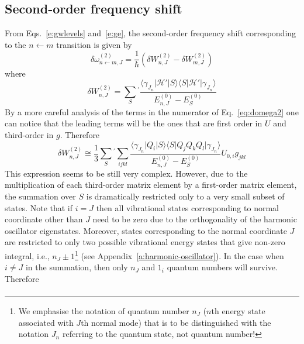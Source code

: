 \documentclass[a4paper,titlepage,twoside,fleqn,12pt]{book}
\begin{document}
\begin{refsection}
\subsection{Second-order frequency shift}

From Eqs.~\eqref{e:gwlevels} and~\eqref{e:ge}, the second\hyp{}order 
frequency shift corresponding to the $n\leftarrow m$ transition 
is given by
%
\begin{equation}\label{e:dw-second-order-pt}
\delta \omega_{n\leftarrow m,J}^{(2)} = 
\frac{1}{\hbar} 
\left( \delta W_{n,J}^{(2)} - \delta W_{m,J}^{(2)} \right)
\end{equation}
%
where
%
\begin{equation}\label{eq:domega2}
\delta W_{n,J}^{(2)} = \sum_{S}{^{'}}
\frac{
   \langle \gamma_{J_n} \vert \mathscr{H}' \vert S            \rangle
   \langle S            \vert \mathscr{H}' \vert \gamma_{J_n} \rangle
}{E^{(0)}_{n,J} - E^{(0)}_S}
\end{equation}
%
By a more careful analysis of the terms in the numerator of
Eq.~\eqref{eq:domega2} one can notice that the leading terms
will be the ones that are first order in $U$ and third-order 
in $g$. Therefore 
%
\begin{equation}\label{eq:domega2approx}
\delta W_{n,J}^{(2)} \cong 
\frac{1}{3}
\sum_{S}{^{'}}
\sum_{ijkl}
\frac{
   \langle \gamma_{J_n} \vert Q_i \vert S                   \rangle
   \langle S            \vert Q_jQ_kQ_l \vert \gamma_{J_n}  \rangle
}{E^{(0)}_{n,J} - E^{(0)}_S} U_{0,i} g_{jkl}
\end{equation}
%
This expression seems to be still very complex. However, due to the multiplication of each 
third-order matrix element by a first-order matrix element, the summation
over $S$ is dramatically restricted only to a very small subset of states.
Note that if $i=J$ then all vibrational states corresponding to normal coordinate
other than $J$ need to be zero due to the orthogonality of the harmonic oscillator
eigenstates. Moreover, states corresponding to the normal coordinate $J$ are restricted 
to only two possible
vibrational energy states that give non\hyp{}zero integral, i.e., $n_J \pm 1$\footnote{
We emphasise the notation of quantum number $n_J$ ($n$th energy state associated with 
$J$th normal mode) that is to be distinguished with
the notation $J_n$ referring to the quantum state, not quantum number!} 
(see Appendix~\ref{a:harmonic-oscillator}).
In the case when $i\ne J$ in the summation, then only $n_J$ and $1_i$ quantum numbers will 
survive. Therefore
%
\begin{multline}  \label{eq:1x3}

\end{multline}
\end{refsection}
\end{document}
